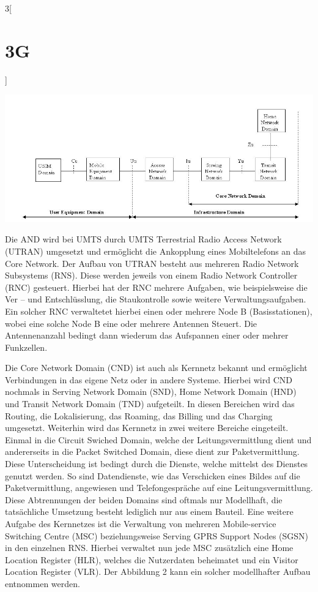 \begin{multicols}{3}[\section{3G}]
\begin{Figure}
\includegraphics[width=\linewidth]{Kapitel/3G/Grafiken/Domains.jpg}
\label{fig:vorlage.vorlesungssaal}
\end{Figure}
 
Die AND wird bei UMTS durch UMTS Terrestrial Radio Access Network (UTRAN) umgesetzt und ermöglicht die Ankopplung eines Mobiltelefons an das Core Network. Der Aufbau von UTRAN besteht aus mehreren Radio Network Subsystems (RNS). Diese werden jeweils von einem Radio Network Controller (RNC) gesteuert. Hierbei hat der RNC mehrere Aufgaben, wie beispielsweise die Ver – und Entschlüsslung, die Staukontrolle sowie weitere Verwaltungsaufgaben. Ein solcher RNC verwaltetet hierbei einen oder mehrere Node B (Basisstationen), wobei eine solche Node B eine oder mehrere Antennen Steuert. Die Antennenanzahl bedingt dann wiederum das Aufspannen einer oder mehrer Funkzellen.

Die Core Network Domain (CND) ist auch als Kernnetz bekannt und ermöglicht Verbindungen in das eigene Netz oder in andere Systeme. Hierbei wird CND nochmals in Serving Network Domain (SND), Home Network Domain (HND) und Transit Network Domain (TND) aufgeteilt. In diesen Bereichen wird das Routing, die Lokalisierung, das Roaming, das Billing und das Charging umgesetzt. Weiterhin wird das Kernnetz in zwei weitere Bereiche eingeteilt. Einmal in die Circuit Swiched Domain, welche der Leitungsvermittlung dient und andererseits in die Packet Switched Domain, diese dient zur Paketvermittlung. Diese Unterscheidung ist bedingt durch die Dienste, welche mittelst des Dienstes genutzt werden. So sind Datendienste, wie das Verschicken eines Bildes auf die Paketvermittlung, angewiesen und Telefongespräche auf eine Leitungsvermittlung.  Diese Abtrennungen der beiden Domains sind oftmals nur Modellhaft, die tatsächliche Umsetzung besteht lediglich nur aus einem Bauteil. Eine weitere Aufgabe des Kernnetzes ist die Verwaltung von mehreren Mobile-service Switching Centre (MSC) beziehungsweise Serving GPRS Support Nodes (SGSN) in den einzelnen RNS. Hierbei verwaltet nun jede MSC zusätzlich eine Home Location Register (HLR), welches die Nutzerdaten beheimatet und ein Visitor Location Register (VLR). Der Abbildung 2 kann ein solcher modellhafter Aufbau entnommen werden.


\end{multicols}
